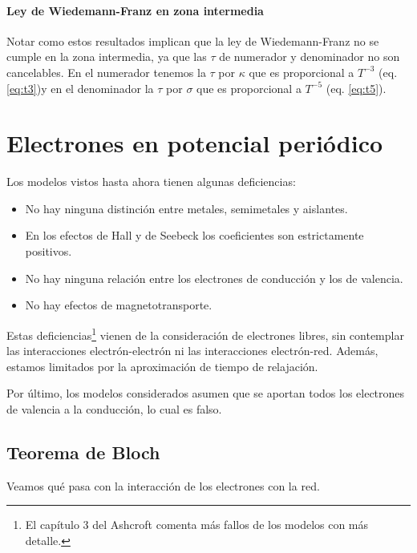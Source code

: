 \subsubsection{Ley de Wiedemann-Franz en zona intermedia}
Notar como estos resultados implican que la ley de Wiedemann-Franz no
se cumple en la zona intermedia, ya que las $\tau$ de numerador y
denominador no son cancelables. En el numerador tenemos la $\tau$ por
$\kappa$ que es proporcional a $T^{-3}$ (eq. \ref{eq:t3})y en el denominador la $\tau$
por $\sigma$ que es proporcional a $T^{-5}$ (eq. \ref{eq:t5}).

\chapter{Electrones en potencial periódico}
Los modelos vistos hasta ahora tienen algunas deficiencias:
\begin{itemize}
\item No hay ninguna distinción entre metales, semimetales y
  aislantes.
\item En los efectos de Hall y de Seebeck los coeficientes son
  estrictamente positivos.
\item No hay ninguna relación entre los electrones de conducción y los
  de valencia.
\item No hay efectos de magnetotransporte.
\end{itemize}
Estas deficiencias\footnote{El capítulo 3 del Ashcroft comenta más
  fallos de los modelos con más detalle.} vienen de la consideración
de electrones libres, sin contemplar las interacciones
electrón-electrón ni las interacciones electrón-red. Además, estamos
limitados por la aproximación de tiempo de relajación.

Por último, los modelos considerados asumen que se aportan todos los
electrones de valencia a la conducción, lo cual es falso.

\section{Teorema de Bloch}
Veamos qué pasa con la interacción de los electrones con la red.

